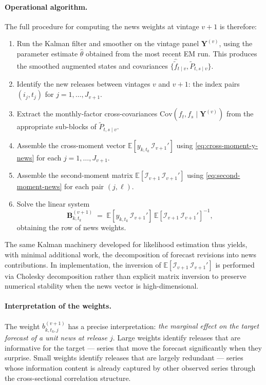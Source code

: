 \documentclass[11pt, a4paper, oneside]{article}
\begin{document}
\paragraph{Operational algorithm.}
The full procedure for computing the news weights at vintage $v+1$
is therefore:
\begin{enumerate}[leftmargin=1.5em, itemsep=2pt]
    \item Run the Kalman filter and smoother on the vintage panel
          $\mathbf{Y}^{(v)}$, using the parameter estimate
          $\hat{\theta}$ obtained from the most recent EM run.
          This produces the smoothed augmented states and covariances
          $\{\hat{\tilde{f}}_{t \mid v}, \tilde{P}_{t, s \mid v}\}$.
    \item Identify the new releases between vintages $v$ and $v+1$:
          the index pairs $(i_j, t_j)$ for $j = 1, \ldots, J_{v+1}$.
    \item Extract the monthly-factor cross-covariances
          $\mathrm{Cov}(f_t, f_s \mid \mathbf{Y}^{(v)})$ from the
          appropriate sub-blocks of $\tilde{P}_{t, s \mid v}$.
    \item Assemble the cross-moment vector
          $\mathbb{E}[y_{k, t_k}\, \mathcal{I}_{v+1}']$ using
          \eqref{eq:cross-moment-y-news} for each $j = 1, \ldots, J_{v+1}$.
    \item Assemble the second-moment matrix
          $\mathbb{E}[\mathcal{I}_{v+1}\, \mathcal{I}_{v+1}']$ using
          \eqref{eq:second-moment-news} for each pair $(j, \ell)$.
    \item Solve the linear system
          \[
          \mathbf{B}_{k, t_k}^{(v+1)} \;=\;
          \mathbb{E}[y_{k, t_k}\, \mathcal{I}_{v+1}']\,
          \mathbb{E}[\mathcal{I}_{v+1}\, \mathcal{I}_{v+1}']^{-1},
          \]
          obtaining the row of news weights.
\end{enumerate}
The same Kalman machinery developed for likelihood estimation thus
yields, with minimal additional work, the decomposition of forecast
revisions into news contributions. In implementation, the inversion
of $\mathbb{E}[\mathcal{I}_{v+1}\, \mathcal{I}_{v+1}']$ is performed
via Cholesky decomposition rather than explicit matrix inversion to
preserve numerical stability when the news vector is high-dimensional.

\paragraph{Interpretation of the weights.}
The weight $b_{k, t_k, j}^{(v+1)}$ has a precise interpretation:
\emph{the marginal effect on the target forecast of a unit news at
release $j$}. Large weights identify releases that are informative
for the target — series that move the forecast significantly when
they surprise. Small weights identify releases that are largely
redundant — series whose information content is already captured by
other observed series through the cross-sectional correlation
structure.
\end{document}
